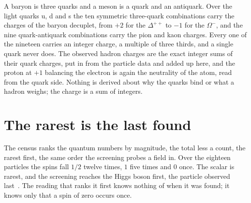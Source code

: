 A baryon is three quarks and a meson is a quark and an antiquark. Over the light quarks u, d and s the
ten symmetric three-quark combinations carry the charges of the baryon decuplet, from $+2$ for the
$\Delta^{++}$ to $-1$ for the $\Omega^-$, and the nine quark-antiquark combinations carry the pion and
kaon charges. Every one of the nineteen carries an integer charge, a multiple of three thirds, and a
single quark never does. The observed hadron charges are the exact integer sums of their quark
charges, put in from the particle data and added up here, and the proton at $+1$ balancing the
electron is again the neutrality of the atom, read from the quark side. Nothing is derived about why
the quarks bind or what a hadron weighs; the charge is a sum of integers.

\section{The rarest is the last found}

The census ranks the quantum numbers by magnitude, the total less a count, the rarest first, the same
order the screening probes a field in. Over the eighteen particles the spins fall $1/2$ twelve times,
$1$ five times and $0$ once. The scalar is rarest, and the screening reaches the Higgs boson first,
the particle observed last~\cite{src:ATLAS-2012,src:CMS-2012}. The reading that ranks it first knows
nothing of when it was found; it knows only that a spin of zero occurs once.
